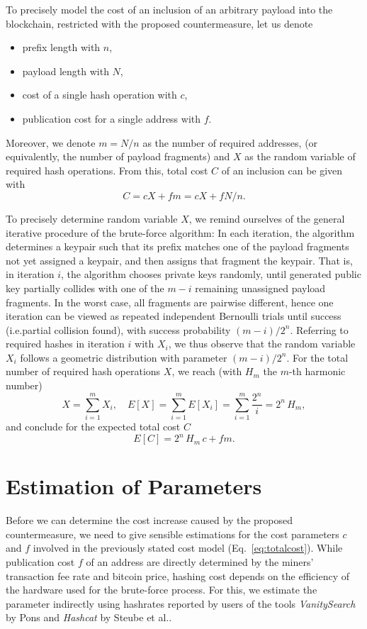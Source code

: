 \documentclass[a4paper,11pt,titlepage]{scrbook}
\begin{document}
To precisely model the cost of an inclusion of an arbitrary payload into the blockchain, restricted with the proposed countermeasure, let us denote
\begin{itemize}[noitemsep]
    \item prefix length with $n$,
    \item payload length with $N$,
    \item cost of a single hash operation with $c$,
    \item publication cost for a single address with $f$.
\end{itemize}
Moreover, we denote $m=N/n$ as the number of required addresses, (or equivalently, the number of payload fragments) and $X$ as the random variable of required hash operations.
From this, total cost $C$ of an inclusion can be given with
\[ C =  c X + fm = c X + fN/n . \]

To precisely determine random variable $X$, we remind ourselves of the general iterative procedure of the brute-force algorithm:
In each iteration, the algorithm determines a keypair such that its prefix matches one of the payload fragments not yet assigned a keypair, and then assigns that fragment the keypair.
That is, in iteration $i$, the algorithm chooses private keys randomly, until generated public key partially collides with one of the $m-i$ remaining unassigned payload fragments.
In the worst case, all fragments are pairwise different, hence one iteration can be viewed as repeated independent Bernoulli trials until success (i.e.\@ partial collision found), with success probability $(m-i)/2^n$.
Referring to required hashes in iteration $i$ with $X_i$, we thus observe that the random variable $X_i$ follows a geometric distribution with parameter $(m-i)/2^n$.
For the total number of required hash operations $X$, we reach (with $H_m$ the $m$-th harmonic number)
\[ X = \sum_{i=1}^{m} X_i, \quad E[X] = \sum_{i=1}^{m} E[X_i] = \sum_{i=1}^{m}\frac{2^n}{i} = 2^n\, H_m, \]
and conclude for the expected total cost $C$
\begin{equation}
    E[C] = 2^n\, H_m\,c + fm.\label{eq:totalcost}
\end{equation}

\section{Estimation of Parameters}\label{sec:parameters}

Before we can determine the cost increase caused by the proposed countermeasure, we need to give sensible estimations for the cost parameters $c$ and $f$ involved in the previously stated cost model (Eq.~\ref{eq:totalcost}).
While publication cost $f$ of an address are directly determined by the miners' transaction fee rate and bitcoin price, hashing cost depends on the efficiency of the hardware used for the brute-force process.
For this, we estimate the parameter indirectly using hashrates reported by users of the tools \emph{VanitySearch} by Pons \cite{vanitysearch_2019} and \emph{Hashcat} by Steube et al.\@ \cite{hashcat_2020}.
\end{document}
